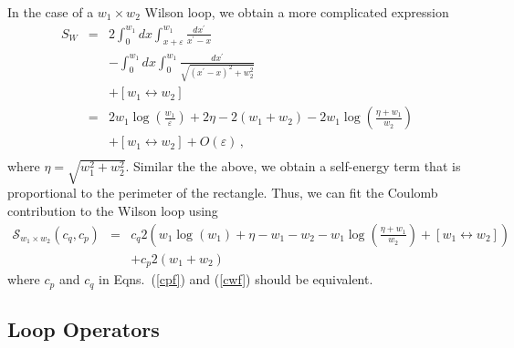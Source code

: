 \documentclass[preprint,aps,prd]{revtex4-2}
\begin{document}
In the case of a $w_1\times w_2$ Wilson loop, we obtain
a more complicated expression
%
\begin{eqnarray}
  S_W &=& 2 \int_0^{w_1} dx \int_{x+\varepsilon}^{w_1} \frac{dx^\prime}{x^\prime-x}
               \nonumber\\
               & &  - \int_0^{w_1} dx \int_{0}^{w_1} \frac{dx^\prime}{
                 \sqrt{(x^\prime-x)^2+ w_2^2}}
               \nonumber\\
               & &  +\left[w_1 \leftrightarrow w_2 \right]\\
   &=&  2 w_1 \log\left(\frac{w_1}{\varepsilon}\right)
       + 2 \eta - 2\left(w_1+w_2\right)
            - 2 w_1 \log\left(\frac{\eta +w_1}{w_2}\right)               
               \nonumber\\
   & &  +\left[w_1 \leftrightarrow w_2\right] + O(\varepsilon) \, ,\\
\end{eqnarray}
where $\eta=\sqrt{w_1^2+w_2^2}$.  Similar the the above, 
we obtain a self-energy term that is proportional to the perimeter of
the rectangle.  Thus, we can fit the Coulomb
contribution to the Wilson loop using
%
\begin{eqnarray}
  \mathcal{S}_{w_1\times w_2}\left(c_q, c_p\right) & = &
     c_q 2 \left(w_1 \log\left({w_1}\right) + \eta
        -  w_1 - w_2
        -  w_1 \log\left(\frac{\eta +w_1}{w_2}\right)
        + \left[w_1 \leftrightarrow w_2\right]\right)
        \nonumber\\ 
 &&  + c_p  2\left(w_1+w_2\right)  \label{cwf}
\end{eqnarray}
%
where $c_p$ and $c_q$ in Eqns.~(\ref{cpf}) and (\ref{cwf})
should be equivalent.

\subsection{Loop Operators}
\end{document}

